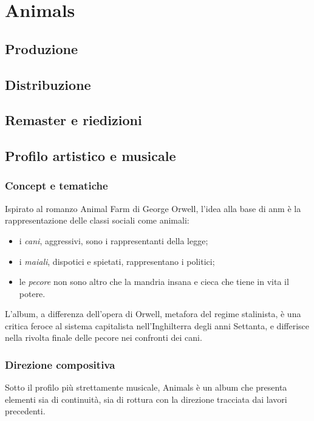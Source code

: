 \documentclass[class=book, crop=false, oneside, 12pt]{standalone}
\begin{document}
    \chapter{Animals}
    \section{Produzione}
    \section{Distribuzione}
    \section{Remaster e riedizioni}
    \section{Profilo artistico e musicale}

    \subsection{Concept e tematiche}
    \label{subsec:animals-concept}
    Ispirato al romanzo Animal Farm di George Orwell, l'idea alla base di \acrshort{anm} è la rappresentazione delle classi sociali come  animali: 
    \begin{itemize}
        \item i  \emph{cani}, aggressivi, sono i rappresentanti della legge;
        \item i  \emph{maiali}, dispotici e spietati, rappresentano i politici;
        \item le \emph{pecore} non sono altro che la mandria insana e cieca che tiene in vita il potere.
    \end{itemize}
    
    L'album, a differenza dell'opera di Orwell, metafora del regime stalinista, è una critica feroce al sistema capitalista nell'Inghilterra degli anni Settanta, e differisce nella rivolta finale delle pecore nei confronti dei cani.

    \subsection{Direzione compositiva}
    \label{subsec:animals-songwriting}
    Sotto il profilo più strettamente musicale, Animals è un album che presenta elementi sia di continuità, sia di rottura con la direzione tracciata dai lavori precedenti. 
    
\end{document}
